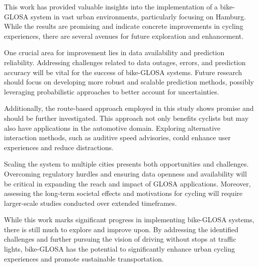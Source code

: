 \begin{Summary}[Outlook]
This work has provided valuable insights into the implementation of a bike-GLOSA system in vast urban environments, particularly focusing on Hamburg. While the results are promising and indicate concrete improvements in cycling experiences, there are several avenues for future exploration and enhancement.

One crucial area for improvement lies in data availability and prediction reliability. Addressing challenges related to data outages, errors, and prediction accuracy will be vital for the success of bike-GLOSA systems. Future research should focus on developing more robust and scalable prediction methods, possibly leveraging probabilistic approaches to better account for uncertainties.

Additionally, the route-based approach employed in this study shows promise and should be further investigated. This approach not only benefits cyclists but may also have applications in the automotive domain. Exploring alternative interaction methods, such as auditive speed advisories, could enhance user experiences and reduce distractions.

Scaling the system to multiple cities presents both opportunities and challenges. Overcoming regulatory hurdles and ensuring data openness and availability will be critical in expanding the reach and impact of GLOSA applications. Moreover, assessing the long-term societal effects and motivations for cycling will require larger-scale studies conducted over extended timeframes.

While this work marks significant progress in implementing bike-GLOSA systems, there is still much to explore and improve upon. By addressing the identified challenges and further pursuing the vision of driving without stops at traffic lights, bike-GLOSA has the potential to significantly enhance urban cycling experiences and promote sustainable transportation.
\end{Summary}